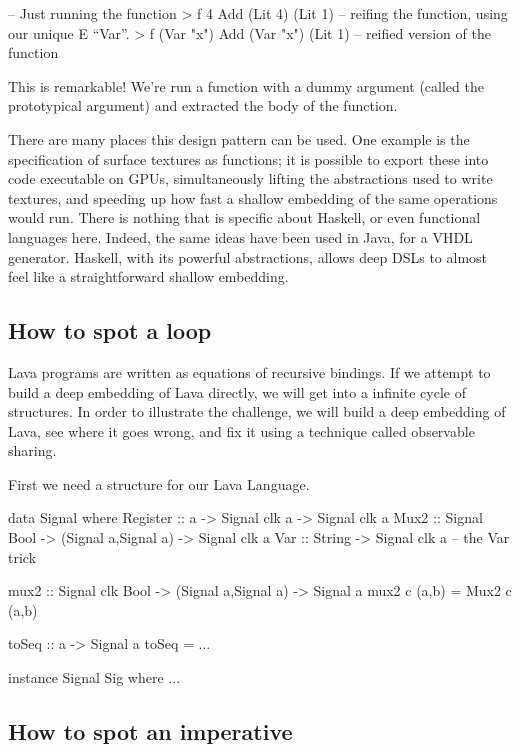 \documentclass[11pt]{article}
\begin{document}
\begin{Code}
-- Just running the function
> f 4
Add (Lit 4) (Lit 1)
-- reifing the function, using our unique E ``Var''.
> f (Var "x")
Add (Var "x") (Lit 1)   -- reified version of the function
\end{Code}

This is remarkable! We're run a function with 
a dummy argument (called the prototypical argument)
and extracted the body of the function.

There are many places this design pattern can be used. One example is the specification
of surface textures as functions; it is possible to export these into code executable
on GPUs, simultaneously lifting the abstractions used to write textures, and speeding
up how fast a shallow embedding of the same operations would run.  There is nothing
that is specific about Haskell, or even functional languages here. Indeed, the same
ideas have been used in Java, for a VHDL generator. Haskell, with its powerful abstractions,
allows deep DSLs to almost feel like a straightforward shallow embedding.

\subsection{How to spot a loop}

Lava programs are written as equations of recursive bindings.
If we attempt to build a deep embedding of Lava directly,
we will get into a infinite cycle of structures. In order to illustrate
the challenge, we will build a deep embedding of Lava,
see where it goes wrong, and fix it using a technique called
observable sharing.

First we need a structure for our Lava Language.
\begin{Code}
        
data Signal where
  Register :: a -> Signal clk a                  -> Signal clk a
  Mux2     :: Signal Bool -> (Signal a,Signal a) -> Signal clk a
  Var      :: String                             -> Signal clk a -- the Var trick

mux2 :: Signal clk Bool -> (Signal a,Signal a) -> Signal a
mux2 c (a,b) = Mux2 c (a,b)

toSeq :: a -> Signal a
toSeq = ...

instance Signal Sig where {...}

\end{Code}

\subsection{How to spot an imperative}
\end{document}
